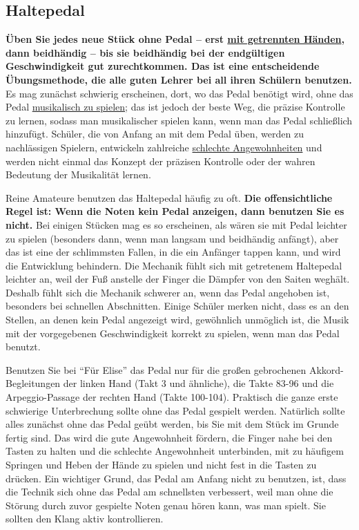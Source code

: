 
\subsection{Haltepedal}
\label{c1ii23}

\textbf{Üben Sie jedes neue Stück ohne Pedal -- erst \hyperref[c1ii7]{mit getrennten Händen}, dann beidhändig -- bis sie beidhändig bei der endgültigen Geschwindigkeit gut zurechtkommen.
Das ist eine entscheidende Übungsmethode, die alle guten Lehrer bei all ihren Schülern benutzen.}
Es mag zunächst schwierig erscheinen, dort, wo das Pedal benötigt wird, ohne das Pedal \hyperref[c1iii14d]{musikalisch zu spielen};
das ist jedoch der beste Weg, die präzise Kontrolle zu lernen, sodass man musikalischer spielen kann, wenn man das Pedal schließlich hinzufügt.
Schüler, die von Anfang an mit dem Pedal üben, werden zu nachlässigen Spielern, entwickeln zahlreiche \hyperref[c1ii22]{schlechte Angewohnheiten} und werden nicht einmal das Konzept der präzisen Kontrolle oder der wahren Bedeutung der Musikalität lernen.

Reine Amateure benutzen das Haltepedal häufig zu oft.
\textbf{Die offensichtliche Regel ist: Wenn die Noten kein Pedal anzeigen, dann benutzen Sie es nicht.}
Bei einigen Stücken mag es so erscheinen, als wären sie mit Pedal leichter zu spielen (besonders dann, wenn man langsam und beidhändig anfängt), aber das ist eine der schlimmsten Fallen, in die ein Anfänger tappen kann, und wird die Entwicklung behindern.
Die Mechanik fühlt sich mit getretenem Haltepedal leichter an, weil der Fuß anstelle der Finger die Dämpfer von den Saiten weghält.
Deshalb fühlt sich die Mechanik schwerer an, wenn das Pedal angehoben ist, besonders bei schnellen Abschnitten.
Einige Schüler merken nicht, dass es an den Stellen, an denen kein Pedal angezeigt wird, gewöhnlich unmöglich ist, die Musik mit der vorgegebenen Geschwindigkeit korrekt zu spielen, wenn man das Pedal benutzt.

Benutzen Sie bei \enquote{Für Elise} das Pedal nur für die großen gebrochenen Akkord-Begleitungen der linken Hand (Takt 3 und ähnliche), die Takte 83-96 und die Arpeggio-Passage der rechten Hand (Takte 100-104).
Praktisch die ganze erste schwierige Unterbrechung sollte ohne das Pedal gespielt werden.
Natürlich sollte alles zunächst ohne das Pedal geübt werden, bis Sie mit dem Stück im Grunde fertig sind.
Das wird die gute Angewohnheit fördern, die Finger nahe bei den Tasten zu halten und die schlechte Angewohnheit unterbinden, mit zu häufigem Springen und Heben der Hände zu spielen und nicht fest in die Tasten zu drücken.
Ein wichtiger Grund, das Pedal am Anfang nicht zu benutzen, ist, dass die Technik sich ohne das Pedal am schnellsten verbessert, weil man ohne die Störung durch zuvor gespielte Noten genau hören kann, was man spielt.
Sie sollten den Klang aktiv kontrollieren.

